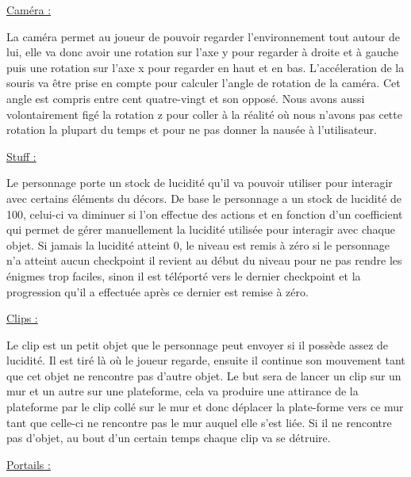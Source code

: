 \documentclass[a4paper , 12pt]{article}
\begin{document}
\newpage

	\underline{Caméra : }

	\quad

La caméra permet au joueur de pouvoir regarder l'environnement tout autour de lui, elle va donc avoir une rotation sur l’axe y pour regarder à droite et à gauche puis une rotation sur l’axe x pour regarder en haut et en bas. L’accéleration de la souris va être prise en compte pour calculer l’angle de rotation de la caméra. Cet angle est compris entre cent quatre-vingt et son opposé. Nous avons aussi volontairement figé la rotation z pour coller à la réalité où nous n’avons pas cette rotation la plupart du temps et pour ne pas donner la nausée à l’utilisateur.

\quad

	\underline{Stuff : }

	\quad

Le personnage porte un stock de lucidité qu’il va pouvoir utiliser pour interagir avec certains éléments du décors. De base le personnage a un stock de lucidité de 100, celui-ci va diminuer si l’on effectue des actions et en fonction d’un coefficient qui permet de gérer manuellement la lucidité utilisée pour interagir avec chaque objet. Si jamais la lucidité atteint 0, le niveau est remis à zéro si le personnage n’a atteint aucun checkpoint il revient au début du niveau pour ne pas rendre les énigmes trop faciles, sinon il est téléporté vers le dernier checkpoint et la progression qu’il a effectuée après ce dernier est remise à zéro.



\quad

	\underline{Clips : }

	\quad

Le clip est un petit objet que le personnage peut envoyer si il possède assez de lucidité. Il est tiré là où le joueur regarde, ensuite il continue son mouvement tant que cet objet ne rencontre pas d’autre objet. Le but sera de lancer un clip sur un mur et un autre sur une plateforme, cela va produire une attirance de la plateforme par le clip collé sur le mur et donc déplacer la plate-forme vers ce mur tant que celle-ci ne rencontre pas le mur auquel elle s’est liée. Si il ne rencontre pas d’objet, au bout d’un certain temps chaque clip va se détruire.

\newpage

	\underline{Portails : }

	\quad
\end{document}
